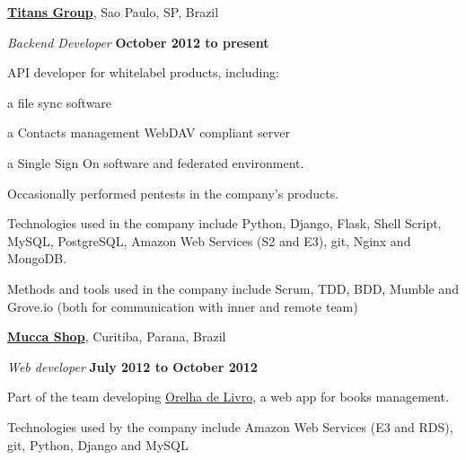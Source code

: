 \documentclass[10pt]{article}
\newenvironment{outerlist}[1][\enskip\textbullet]%
        {\begin{itemize}[#1]}{\end{itemize}%
         \vspace{-.6\baselineskip}}
\newenvironment{innerlist}[1][\enskip\textbullet]%
        {\begin{compactitem}[#1]}{\end{compactitem}}
\newcommand{\blankline}{\quad\pagebreak[2]}
\begin{document}
\href{http://titansgroup.com.br/}{\textbf{Titans Group}},
Sao Paulo, SP, Brazil
\begin{outerlist}

\item[] \textit{Backend Developer}%
        \hfill \textbf{October 2012 to present}
\begin{innerlist}
    \item API developer for whitelabel products, including:
        \begin{innerlist}
            \item a file sync software
            \item a Contacts management WebDAV compliant server
            \item a Single Sign On software and federated environment.
        \end{innerlist}
    \item Occasionally performed pentests in the company's products.

    \item Technologies used in the company include Python, Django, Flask, Shell Script, MySQL, PostgreSQL, Amazon Web Services
    (S2 and E3), git, Nginx and MongoDB.
    \item Methods and tools used in the company include Scrum, TDD, BDD, Mumble and Grove.io (both for communication
    with inner and remote team)
\end{innerlist}

\end{outerlist}

\blankline

\href{http://www.muccashop.com.br/}{\textbf{Mucca Shop}},
Curitiba, Parana, Brazil
\begin{outerlist}

\item[] \textit{Web developer}%
        \hfill \textbf{July 2012 to October 2012}
\begin{innerlist}
    \item Part of the team developing \href{http://www.orelhadelivro.com.br/}{Orelha de Livro}, a web
    app for books management.
    \item Technologies used by the company include Amazon Web Services (E3 and RDS), git, Python, Django and MySQL
\end{innerlist}

\end{outerlist}

\blankline
\end{document}
